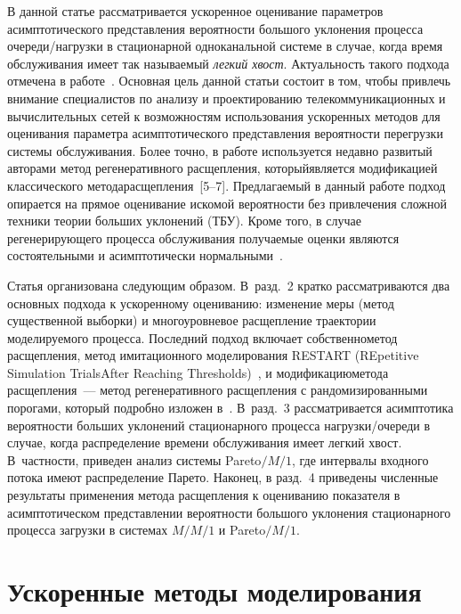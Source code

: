 \begin{multicols}{2}
В данной статье рассматривается ускоренное оценивание параметров
асимптотического представления вероятности большого уклонения\linebreak
процесса очереди/нагрузки в стационарной одноканальной системе в
случае, когда время обслуживания имеет так называемый \textit{легкий
хвост}. Актуальность такого подхода отмечена в работе~\cite{Morozov-asymptotics}. 
Основная цель данной статьи состоит в том,
чтобы привлечь внимание  специалистов по анализу и проектированию
телекоммуникационных и вычислительных сетей к возможностям
использования ускоренных методов для оценивания па\-ра\-мет\-ра
асимптотического представления вероятности перегрузки системы
обслуживания. Более точно, в работе используется недавно развитый
авторами метод регенеративного расщепления, который\linebreak является
модификацией классического метода\linebreak расщепления~[5--7]. 
Предлагаемый в данный работе подход опирается на прямое
оценивание искомой  вероятности  без привлечения сложной техники
тео\-рии больших уклонений (ТБУ). Кроме того, в случае регенерирующего
процесса обслуживания получаемые оценки являются состоятельными и
асимптотически нормальными~\cite{diss_2008, AG}.

Статья организована следующим образом. В~разд.~2 кратко
рассматриваются два основных подхода к ускоренному оцениванию:
изменение меры (метод существенной выборки) и многоуровневое
расщепление траектории моделируемого процесса. Последний подход
включает собственно\linebreak  метод расщепления, метод имитационного моделирования RESTART
(REpetitive Simulation
Trials\linebreak After Reaching Thresholds)~\cite{Alt91},
и модификацию\linebreak метода расщепления~--- метод регенеративного
расщепления с рандомизированными порогами, который подробно изложен
в~\cite{diss_2008}. В~разд.~3 рассматривается асимптотика
ве\-ро\-ят\-ности больших уклонений стационарного  процесса
нагрузки/очереди в случае, когда распределение  времени обслуживания
имеет  легкий хвост. В~частности, приведен анализ системы
Pareto$/M/1$, где интервалы входного потока имеют распределение
Парето. Наконец, в разд.~4 приведены численные результаты
применения метода расщепления к оцениванию показателя  в
асимптотическом пред\-став\-ле\-нии вероятности большого уклонения
стационарного процесса загрузки в системах $M/M/1$ и Pareto$/M/1$.

\section{Ускоренные методы моделирования }


\end{multicols}
